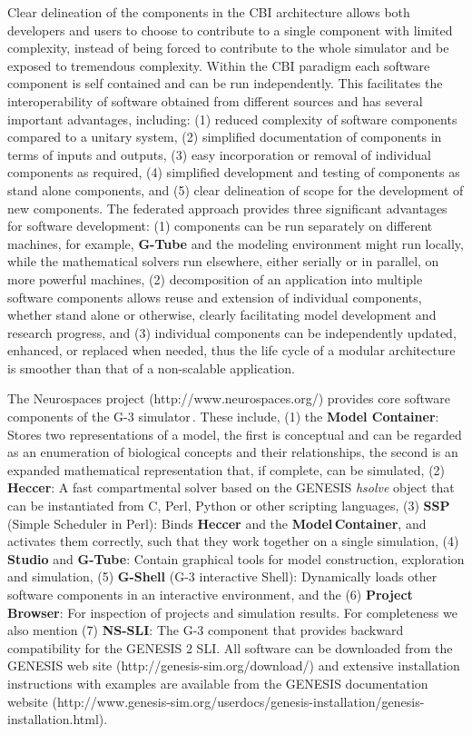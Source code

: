 \documentclass[12pt]{article}
\begin{document}
Clear delineation of the components in the CBI architecture allows both
developers and users to choose to contribute to a single component
with limited complexity, instead of being forced to contribute to the
whole simulator and be exposed to tremendous complexity. Within the
CBI paradigm each software component is self contained and can be run independently. This facilitates the
interoperability of software obtained from different sources and has
several important advantages, including: (1) reduced complexity of
software components compared to a unitary system, (2) simplified
documentation of components in terms of inputs and outputs, (3) easy
incorporation or removal of individual components as required, (4)
simplified development and testing of components as stand alone
components, and (5) clear delineation of scope for the development of new
components. The federated approach provides three significant advantages
for software development: (1) components can be run separately on
different machines, for example, {\bf G-Tube} and the modeling environment
might run locally, while the mathematical solvers run elsewhere, either serially
or in parallel, on more powerful machines, (2) decomposition of an
application into multiple software components allows reuse and
extension of individual components, whether stand alone or otherwise,
clearly facilitating model development and research progress, and (3)
individual components can be independently updated, enhanced, or
replaced when needed, thus the life cycle of a modular architecture is
smoother than that of a non-scalable application.

The Neurospaces project (http://www.neurospaces.org/) provides
core software components of the G-3
simulator\,\cite{cornelis03:_neuros}. These include, (1) the {\bf Model
  Container}: Stores two representations of a model, the first is
conceptual and can be regarded as an enumeration of biological
concepts and their relationships, the second is an expanded
mathematical representation that, if complete, can be simulated, (2)
{\bf Heccer}: A fast compartmental solver based on the GENESIS {\it
  hsolve} object that can be instantiated from C, Perl, Python or
other scripting languages, (3) {\bf SSP} (Simple Scheduler in Perl):
Binds {\bf Heccer} and the {\bf Model\,Container}, and activates them
correctly, such that they work together on a single simulation, (4)
{\bf Studio} and {\bf G-Tube}: Contain graphical tools for model
construction, exploration and simulation, (5) {\bf G-Shell} (G-3 interactive Shell):
Dynamically loads other software components in an interactive
environment, and the (6) {\bf Project\,Browser}: For inspection of projects
and simulation results. For completeness we also mention (7) {\bf
  NS-SLI}: The G-3 component that provides backward compatibility for
the GENESIS 2 SLI. All software can be downloaded from the GENESIS web site
(http://genesis-sim.org/download/) and extensive installation
instructions with examples are available from the GENESIS
documentation website
(http://www.genesis-sim.org/userdocs/genesis-installation/genesis-installation.html).
\end{document}
